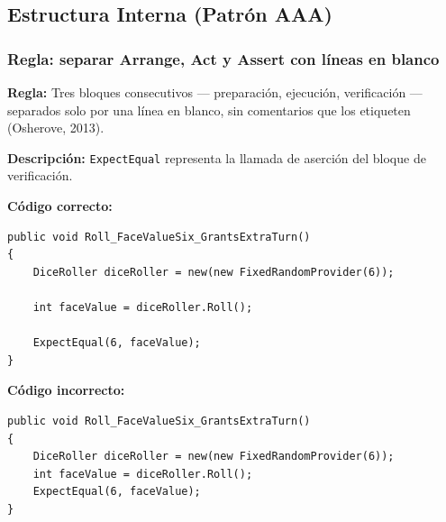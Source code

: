\subsection{Estructura Interna (Patrón AAA)}

\subsubsection{Regla: separar Arrange, Act y Assert con líneas en blanco}

\textbf{Regla:} Tres bloques consecutivos --- preparación, ejecución, verificación --- separados solo por una línea en blanco, sin comentarios que los etiqueten (Osherove, 2013).

\textbf{Descripción:} \texttt{ExpectEqual} representa la llamada de aserción del bloque de verificación.

\textbf{Código correcto:}
\begin{lstlisting}[style=csharpstyle]
public void Roll_FaceValueSix_GrantsExtraTurn()
{
    DiceRoller diceRoller = new(new FixedRandomProvider(6));

    int faceValue = diceRoller.Roll();

    ExpectEqual(6, faceValue);
}
\end{lstlisting}

\textbf{Código incorrecto:}
\begin{lstlisting}[style=csharpstyle]
public void Roll_FaceValueSix_GrantsExtraTurn()
{
    DiceRoller diceRoller = new(new FixedRandomProvider(6));
    int faceValue = diceRoller.Roll();
    ExpectEqual(6, faceValue);
}
\end{lstlisting}
